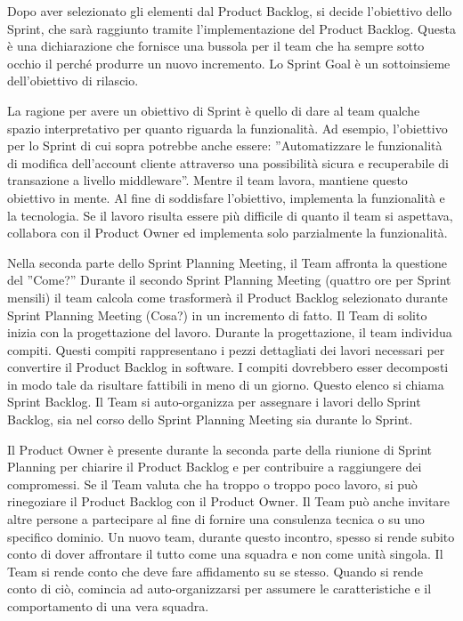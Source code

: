 Dopo aver selezionato  gli elementi dal Product Backlog, si decide l'obiettivo dello Sprint, che sar\`a raggiunto tramite
l'implementazione del Product Backlog. Questa \`e una dichiarazione che fornisce una bussola per il team che ha sempre
sotto occhio il perch\'e produrre un nuovo incremento. Lo Sprint Goal \`e un sottoinsieme dell'obiettivo di rilascio.
\newline

La ragione per avere un obiettivo di Sprint \`e quello di dare al team qualche spazio interpretativo per quanto
riguarda la funzionalit\`a. Ad esempio, l'obiettivo per lo Sprint di cui sopra potrebbe anche essere: ''Automatizzare
le funzionalit\`a di modifica dell'account cliente attraverso una possibilit\`a sicura e recuperabile di transazione a livello middleware''. Mentre il team lavora, mantiene questo obiettivo in mente. Al fine di soddisfare l'obiettivo, implementa
la funzionalit\`a e la tecnologia. Se il lavoro risulta essere pi\`u difficile di quanto il team si aspettava,
collabora con il Product Owner ed implementa solo parzialmente la funzionalit\`a. 
\newline

Nella seconda parte dello Sprint Planning Meeting, il Team affronta la questione del ''Come?'' Durante il secondo Sprint Planning Meeting (quattro ore per Sprint mensili) il team calcola come trasformer\`a il Product Backlog selezionato durante
Sprint Planning Meeting (Cosa?) in un incremento di fatto. Il Team di solito inizia con la progettazione del lavoro.
Durante la progettazione, il team individua compiti. Questi compiti rappresentano i pezzi dettagliati dei lavori
necessari per convertire il Product Backlog in software. I compiti dovrebbero esser decomposti in modo tale da risultare
fattibili in meno di un giorno. Questo elenco si chiama Sprint Backlog. Il Team si auto-organizza per 
assegnare i lavori dello Sprint Backlog, sia nel corso dello Sprint Planning Meeting sia durante lo Sprint. 
\newline

Il Product Owner \`e presente durante la seconda parte della riunione di Sprint Planning per chiarire il Product
Backlog e per contribuire a raggiungere dei compromessi. Se il Team valuta che ha troppo o troppo poco lavoro, si
pu\`o rinegoziare il Product Backlog con il Product Owner. Il Team pu\`o anche invitare altre persone a partecipare al
fine di fornire una consulenza tecnica o su uno specifico dominio. Un nuovo team, durante questo incontro, spesso si rende subito
conto di dover affrontare il tutto come una squadra e non come unit\`a singola. Il Team si rende conto che deve fare
affidamento su se stesso. Quando si rende conto di ci\`o, comincia ad auto-organizzarsi per assumere le caratteristiche e il
comportamento di una vera squadra.


